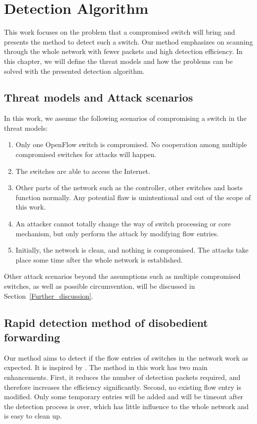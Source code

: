 \chapter{Detection Algorithm}
This work focuses on the problem that a compromised switch will bring and presents the method to detect such a switch. Our method emphasizes on scanning through the whole network with fewer packets and high detection efficiency. In this chapter, we will define the threat models and how the problems can be solved with the presented detection algorithm.

\section{Threat models and Attack scenarios}
In this work, we assume the following scenarios of compromising a switch in the threat models:
\begin{enumerate}
\item
Only one OpenFlow switch is compromised. No cooperation among multiple compromised switches for attacks will happen. 
\item
The switches are able to access the Internet. 
\item
Other parts of the network such as the controller, other switches and hosts function normally. Any potential flaw is unintentional and out of the scope of this work.
\item
An attacker cannot totally change the way of switch processing or core mechanism, but only perform the attack by modifying flow entries.
\item
Initially, the network is clean, and nothing is compromised. The attacks take place some time after the whole network is established.
\end{enumerate}

Other attack scenarios beyond the assumptions such as multiple compromised switches, as well as possible circumvention, will be discussed in Section~\ref{Further_discussion}.

\section{Rapid detection method of disobedient forwarding}
Our method aims to detect if the flow entries of switches in the network work as expected. It is inspired by \cite{CKGL15}. The method in this work has two main enhancements. First, it reduces the number of detection packets required, and therefore increases the efficiency significantly. Second, no existing flow entry is modified. Only some temporary entries will be added and will be timeout after the detection process is over, which has little influence to the whole network and is easy to clean up. 

